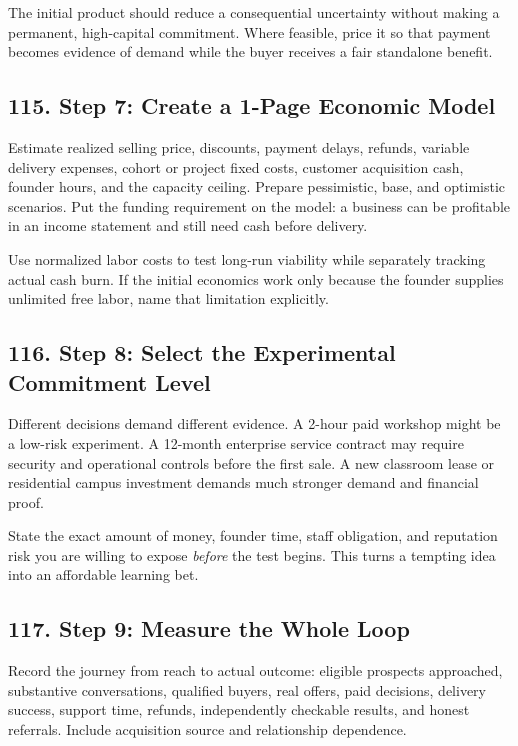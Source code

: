 The initial product should reduce a consequential uncertainty without making a permanent, high-capital commitment. Where feasible, price it so that payment becomes evidence of demand while the buyer receives a fair standalone benefit.

\subsection*{115. Step 7: Create a 1-Page Economic Model}

Estimate realized selling price, discounts, payment delays, refunds, variable delivery expenses, cohort or project fixed costs, customer acquisition cash, founder hours, and the capacity ceiling. Prepare pessimistic, base, and optimistic scenarios. Put the funding requirement on the model: a business can be profitable in an income statement and still need cash before delivery.

Use normalized labor costs to test long-run viability while separately tracking actual cash burn. If the initial economics work only because the founder supplies unlimited free labor, name that limitation explicitly.

\subsection*{116. Step 8: Select the Experimental Commitment Level}

Different decisions demand different evidence. A 2-hour paid workshop might be a low-risk experiment. A 12-month enterprise service contract may require security and operational controls before the first sale. A new classroom lease or residential campus investment demands much stronger demand and financial proof.

State the exact amount of money, founder time, staff obligation, and reputation risk you are willing to expose \emph{before} the test begins. This turns a tempting idea into an affordable learning bet.

\subsection*{117. Step 9: Measure the Whole Loop}

Record the journey from reach to actual outcome: eligible prospects approached, substantive conversations, qualified buyers, real offers, paid decisions, delivery success, support time, refunds, independently checkable results, and honest referrals. Include acquisition source and relationship dependence.

